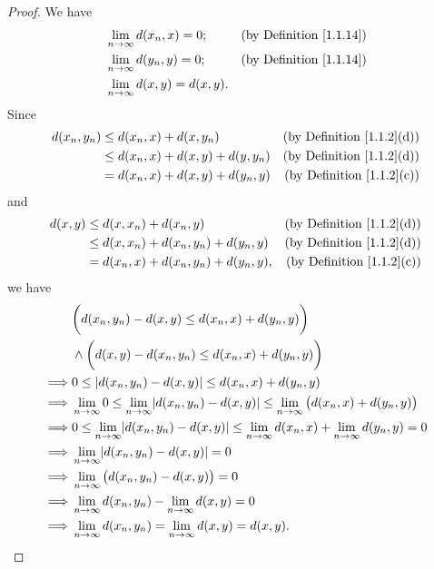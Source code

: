\begin{proof}
    We have
    \begin{align*}
         & \lim_{n \to \infty} d(x_n, x) = 0;       & \text{(by Definition \ref{1.1.14})} \\
         & \lim_{n \to \infty} d(y_n, y) = 0;       & \text{(by Definition \ref{1.1.14})} \\
         & \lim_{n \to \infty} d(x, y)   = d(x, y).
    \end{align*}
    Since
    \begin{align*}
        d(x_n, y_n) & \leq d(x_n, x) + d(x, y_n)           & \text{(by Definition \ref{1.1.2}(d))} \\
                    & \leq d(x_n, x) + d(x, y) + d(y, y_n) & \text{(by Definition \ref{1.1.2}(d))} \\
                    & = d(x_n, x) + d(x, y) + d(y_n, y)    & \text{(by Definition \ref{1.1.2}(c))}
    \end{align*}
    and
    \begin{align*}
        d(x, y) & \leq d(x, x_n) + d(x_n, y)               & \text{(by Definition \ref{1.1.2}(d))} \\
                & \leq d(x, x_n) + d(x_n, y_n) + d(y_n, y) & \text{(by Definition \ref{1.1.2}(d))} \\
                & = d(x_n, x) + d(x_n, y_n) + d(y_n, y),   & \text{(by Definition \ref{1.1.2}(c))}
    \end{align*}
    we have
    \begin{align*}
                 & \bigg(d(x_n, y_n) - d(x, y) \leq d(x_n, x) + d(y_n, y)\bigg)                                                                         \\
                 & \land \bigg(d(x, y) - d(x_n, y_n) \leq d(x_n, x) + d(y_n, y)\bigg)                                                                   \\
        \implies & 0 \leq \abs*{d(x_n, y_n) - d(x, y)} \leq d(x_n, x) + d(y_n, y)                                                                       \\
        \implies & \lim_{n \to \infty} 0 \leq \lim_{n \to \infty} \abs*{d(x_n, y_n) - d(x, y)} \leq \lim_{n \to \infty} \big(d(x_n, x) + d(y_n, y)\big) \\
        \implies & 0 \leq \lim_{n \to \infty} \abs*{d(x_n, y_n) - d(x, y)} \leq \lim_{n \to \infty} d(x_n, x) + \lim_{n \to \infty} d(y_n, y) = 0       \\
        \implies & \lim_{n \to \infty} \abs*{d(x_n, y_n) - d(x, y)} = 0                                                                                 \\
        \implies & \lim_{n \to \infty} \big(d(x_n, y_n) - d(x, y)\big) = 0                                                                              \\
        \implies & \lim_{n \to \infty} d(x_n, y_n) - \lim_{n \to \infty} d(x, y) = 0                                                                    \\
        \implies & \lim_{n \to \infty} d(x_n, y_n) = \lim_{n \to \infty} d(x, y) = d(x, y).
    \end{align*}
\end{proof}